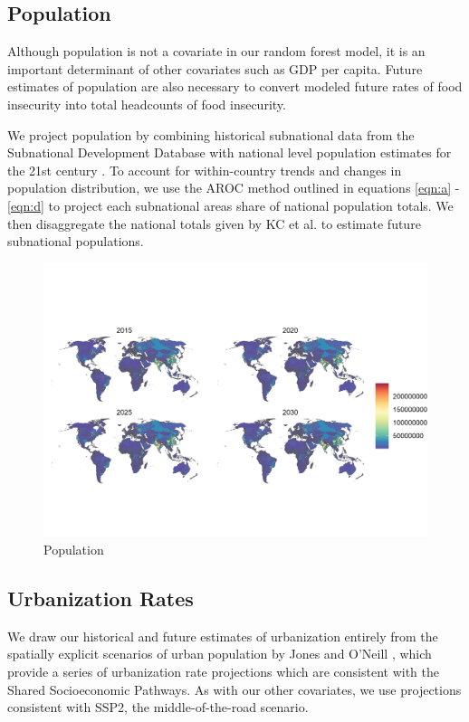 \documentclass{article}
\begin{document}
\pagebreak
\subsection{Population}
Although population is not a covariate in our random forest model, it is an important determinant of other covariates such as GDP per capita. Future estimates of population are also necessary to convert modeled future rates of food insecurity into total headcounts of food insecurity. 

We project population by combining historical subnational data from the Subnational Development Database \citep{Smits2019} with national level population estimates for the 21st century \citep{KC2017}.  To account for within-country trends and changes in population distribution, we use the AROC method outlined in equations \ref{eqn:a} - \ref{eqn:d} to project each subnational areas share of national population totals. We then disaggregate the national totals given by KC et al. to estimate future subnational populations.

\begin{figure}[H]
  \centering
  \includegraphics[width=\linewidth]{img/covars/population.png}
  \caption{Population}
\end{figure}

\pagebreak
\subsection{Urbanization Rates}

We draw our historical and future estimates of urbanization entirely from the spatially explicit scenarios of urban population by Jones and O'Neill \citep{Jones2016}, which provide a series of urbanization rate projections which are consistent with the Shared Socioeconomic Pathways.  As with our other covariates, we use projections consistent with SSP2, the middle-of-the-road scenario. 
\end{document}
